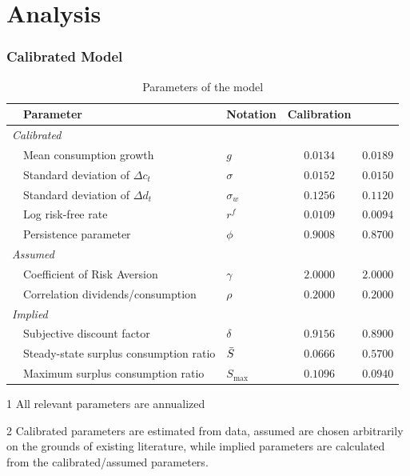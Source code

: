 \section{Analysis} \label{sec:Analysis}

\subsubsection{Calibrated Model}

\begin{table}[H]
\begin{adjustbox}{max width=\textwidth}
\begin{threeparttable}[b]
\caption{Parameters of the model}
\label{tab:ModelCalib}
\begin{tabular}{@{}lllcc@{}}
\toprule
 & Parameter                              & Notation         & Calibration & \citet{Campbell1999}\\ \midrule 
\multicolumn{5}{l}{\textit{Calibrated}}                                    \\
 & Mean consumption growth                & $g$              & $0.0134$  & $0.0189$\\
 & Standard deviation of $\Delta c_t$     & $\sigma$         & $0.0152$  & $0.0150$\\
 & Standard deviation of $\Delta d_t$     & $\sigma_w$       & $0.1256$  & $0.1120$\\
 & Log risk-free rate                     & $r^f$            & $0.0109$  & $0.0094$\\
 & Persistence parameter                  & $\phi$           & $0.9008$  & $0.8700$\\
 \multicolumn{5}{l}{\textit{Assumed}}                                      \\
 & Coefficient of Risk Aversion           & $\gamma$         & $2.0000$  & $2.0000$\\
 & Correlation dividends/consumption      & $\rho$           & $0.2000$  & $0.2000$\\
\multicolumn{5}{l}{\textit{Implied}}                                       \\
 & Subjective discount factor             & $\delta$         & $0.9156$  & $0.8900$\\
 & Steady-state surplus consumption ratio & $\Bar{S}$        & $0.0666$  & $0.5700$\\
 & Maximum surplus consumption ratio      & $S_{\text{max}}$ & $0.1096$  & $0.0940$\\ \bottomrule
\end{tabular}
\begin{tablenotes}
\footnotesize{\item [1] All relevant parameters are annualized
              \item [2] Calibrated parameters are estimated from data, assumed are chosen arbitrarily on the grounds of existing literature, while implied parameters are calculated from the calibrated/assumed parameters.}
\end{tablenotes}
\end{threeparttable}
\end{adjustbox}
\end{table}


